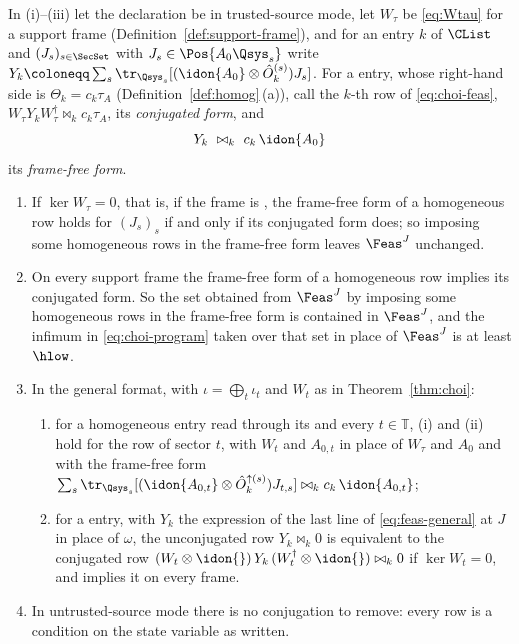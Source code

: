 \begin{proposition}\label{prop:frame-free-rows}
In (i)--(iii) let the declaration be in trusted-source mode, let $W_{\tau}$ be
\eqref{eq:Wtau} for a support frame (Definition~\ref{def:support-frame}),
and for an entry $k$ of $\CList$ and $(J_s)_{s\in\SecSet}$ with
$J_s\in\Pos{A_0\Qsys_s}$ write
$Y_k\coloneqq\sum_s\tr_{\Qsys_s}[(\idon{A_0}\otimes\hat O^{(s)}_k)J_s]$.
For a  entry, whose right-hand side is
$\Theta_k=c_k\tau_A$ (Definition~\ref{def:homog}\,(a)), call the $k$-th row
of \eqref{eq:choi-feas}, $W_{\tau}Y_kW_{\tau}^{\dagger}\bowtie_kc_k\tau_A$,
its \emph{conjugated form}, and
\begin{equation}\label{eq:frame-free-row}
  Y_k\ \bowtie_k\ c_k\,\idon{A_0}
\end{equation}
its \emph{frame-free form}.
\begin{enumerate}[label=(\roman*),leftmargin=2.2em]
\item If $\ker W_{\tau}=0$, that is, if the frame is , the
frame-free form of a homogeneous row holds for $(J_s)_s$ if and only if its
conjugated form does; so imposing some homogeneous rows in the frame-free
form leaves $\Feas^{J}$ unchanged.
\item On every support frame the frame-free form of a homogeneous row
implies its conjugated form. So the set obtained from $\Feas^{J}$ by
imposing some homogeneous rows in the frame-free form is contained in
$\Feas^{J}$, and the infimum in \eqref{eq:choi-program} taken over that set
in place of $\Feas^{J}$ is at least $\hlow$.
\item In the general format, with $\iota=\bigoplus_t\iota_t$ and $W_t$ as in
Theorem~\ref{thm:choi}:
\begin{enumerate}[label=(\alph*),leftmargin=2.2em]
\item for a homogeneous entry read through its  and
every $t\in\mathbb{T}$, (i) and (ii) hold for the row of sector $t$, with
$W_t$ and $A_{0,t}$ in place of $W_{\tau}$ and $A_0$ and with the
frame-free form
$\sum_s\tr_{\Qsys_s}[(\idon{A_{0,t}}\otimes\hat O^{\uparrow(s)}_k)
J_{t,s}]\bowtie_kc_k\,\idon{A_{0,t}}$;
\item for a  entry, with $Y_k$ the expression of the last
line of \eqref{eq:feas-general} at $J$ in place of $\omega$, the
unconjugated row $Y_k\bowtie_k0$ is equivalent to the conjugated row
$(W_t\otimes\idon{})\,Y_k\,(W_t^{\dagger}\otimes\idon{})\bowtie_k0$ if
$\ker W_t=0$, and implies it on every frame.
\end{enumerate}
\item In untrusted-source mode there is no conjugation to remove: every
row is a condition on the state variable as written.
\end{enumerate}
\end{proposition}

